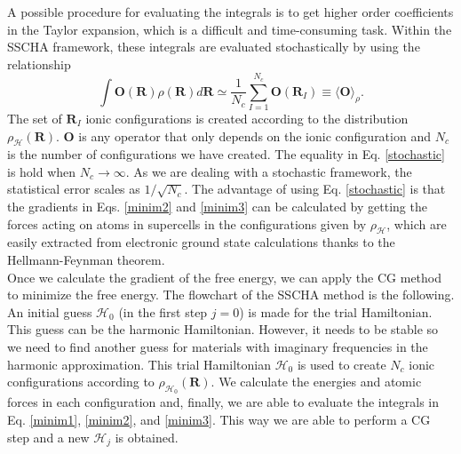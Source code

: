 A possible procedure for evaluating the integrals is to get higher order coefficients in the Taylor expansion, which is a difficult and time-consuming task. Within the SSCHA framework, these integrals are evaluated 
stochastically by using the relationship
\begin{equation}
 \label{stochastic}
 \int{\mathbf{O}(\mathbf{R})\rho(\mathbf{R})d\mathbf{R}}\simeq\frac{1}{N_{c}}\sum_{I=1}^{N_{c}}\mathbf{O}(\mathbf{R}_{I})\equiv\langle\mathbf{O}\rangle_{\rho}.
\end{equation}
The set of $\mathbf{R}_{I}$ ionic configurations is created according to the distribution $\rho_{\mathcal{H}}(\mathbf{R})$. $\mathbf{O}$ is any operator that only depends on the ionic configuration and $N_{c}$ is the number of 
configurations we have created. The equality in Eq. \ref{stochastic} is hold when $N_{c}\rightarrow\infty$. As we are dealing with a stochastic framework, the statistical error scales as $1/\sqrt{N_{c}}$. The advantage 
of using Eq. \ref{stochastic} is that the gradients in Eqs. \ref{minim2} and \ref{minim3} can be calculated by getting the forces acting on atoms in supercells in the configurations given by $\rho_{\mathcal{H}}$, which are easily 
extracted from electronic ground state calculations thanks to the Hellmann-Feynman 
theorem\cite{feynman1939forces}. \\

Once we calculate the gradient of the free energy, we can apply the CG method to minimize the free energy. The flowchart of the SSCHA method is the following. An initial guess $\mathcal{H}_{0}$ (in the first 
step $j=0$) is made for the trial Hamiltonian. This guess can be the harmonic Hamiltonian. However, it needs to be stable so we need to find another guess for materials with imaginary frequencies in the harmonic approximation. This 
trial Hamiltonian $\mathcal{H}_{0}$ is used to create $N_{c}$ ionic configurations according to $\rho_{\mathcal{H}_{0}}(\mathbf{R})$. We calculate the energies and atomic forces in each configuration and, finally, we are able to 
evaluate the integrals in Eq. \ref{minim1}, \ref{minim2}, and \ref{minim3}. This way we are able to perform a CG step and a new $\mathcal{H}_{j}$ is obtained. \\

